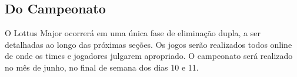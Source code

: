 \subsection{Do Campeonato}

O Lottus Major ocorrerá em uma única fase de eliminação dupla, a ser detalhadas ao longo das próximas seções. Os jogos serão realizados todos online de onde os times e jogadores julgarem apropriado. O campeonato será realizado no mês de junho, no final de semana dos dias 10 e 11.

